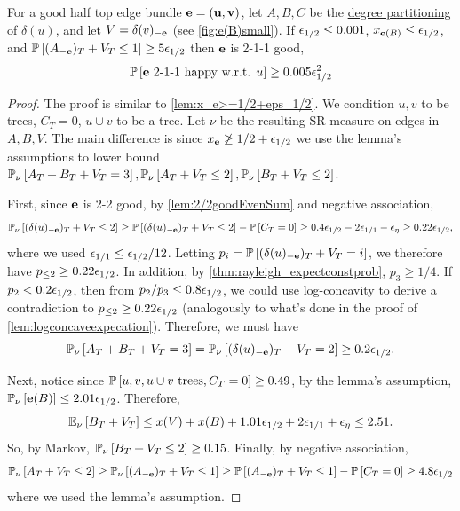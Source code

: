 \begin{lemma}\label{lem:<=1211good}	
For a good half top edge bundle $\bbe={\bf (u,v)}$, let $A,B,C$ be the \hyperlink{tar:degreepartition}{degree partitioning} of $\delta(u)$, and  let $V=\delta(v)_{-\bbe}$ (see \cref{fig:e(B)small}). If $\eps_{1/2}\leq 0.001$, $x_{\bbe(B)}\leq \eps_{1/2}$, and $\P{(A_{-\bbe})_T + V_T\leq 1}\geq 5\eps_{1/2}$  then $\bbe$ is 2-1-1 good,
$$ \P{\bbe \text{ 2-1-1 happy w.r.t. $u$}} \geq 0.005\eps_{1/2}^2$$
\end{lemma}
\begin{proof}
The proof is similar to \cref{lem:x_e>=1/2+eps_1/2}. We condition $u,v$ to be trees, $C_T=0$, $u\cup v$  to be a tree.
Let $\nu$ be the resulting SR measure on edges in $A,B,V$.
 The main difference is since $x_\bbe\not\geq 1/2+\eps_{1/2}$ we use the lemma's assumptions to lower bound $\PP{\nu}{A_T+B_T+V_T=3},\PP{\nu}{A_T+V_T\leq 2},\PP{\nu}{B_T+V_T\leq 2}$.

First, since $\bbe$ is 2-2 good, by \cref{lem:2/2goodEvenSum} and negative association,
\begin{align*}
\PP{\nu}{(\delta(u)_{-\bbe})_T+V_T\leq 2} \geq \P{(\delta(u)_{-\bbe})_T+V_T\leq 2} - \P{C_T=0} \geq 0.4\eps_{1/2} - 2\eps_{1/1}-\eps_\eta\geq 0.22\eps_{1/2},	
\end{align*}
where we used $\eps_{1/1}\le \eps_{1/2}/12$.
Letting $p_i = \P{(\delta(u)_{-\bbe})_T+V_T = i}$, we therefore have $p_{\le 2} \ge 0.22 \eps_{1/2}$. In addition, by
\cref{thm:rayleigh_expectconstprob}, $p_3 \ge 1/4$.
If $p_2 < 0.2 \eps_{1/2}$, then from
$p_2/p_3 \le 0.8 \eps_{1/2}$, we could use log-concavity to derive a contradiction to $p_{\le 2} \ge 0.22 \eps_{1/2}$ (analogously to what's done in the proof of \cref{lem:logconcaveexpecation}).
Therefore, we must have
$$\PP{\nu}{A_T+B_T+V_T=3}=\PP{\nu}{(\delta(u)_{-\bbe})_T+V_T=2}\geq 0.2\eps_{1/2}.$$


Next, notice since $\P{u,v,u\cup v\text{ trees}, C_T=0}\geq 0.49$, by the lemma's assumption, $\PP{\nu}{\bbe(B)}\leq 2.01\eps_{1/2}$. Therefore, 
$$\EE{\nu}{B_T+V_T}\leq x(V)+x(B)+1.01\eps_{1/2}+2\eps_{1/1}+\eps_\eta \leq 2.51.$$
So, by Markov, $\PP{\nu}{B_T+V_T\leq 2}\geq 0.15$. 
Finally, by negative association, 
$$\PP{\nu}{A_T+V_T\leq 2} \geq \PP{\nu}{(A_{-\bbe})_T+V_T\leq 1} \geq \P{(A_{-\bbe})_T+V_T\leq 1} - \P{C_T=0} \geq 4.8\eps_{1/2}$$
where we used the lemma's assumption. 


\end{proof}
